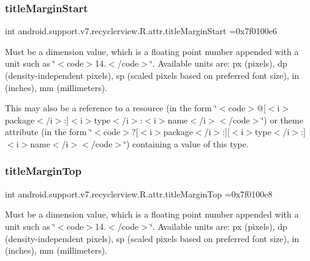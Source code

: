 \subsubsection{\texorpdfstring{title\+Margin\+Start}{titleMarginStart}}
{\footnotesize\ttfamily int android.\+support.\+v7.\+recyclerview.\+R.\+attr.\+title\+Margin\+Start =0x7f0100e6\hspace{0.3cm}{\ttfamily [static]}}

Must be a dimension value, which is a floating point number appended with a unit such as \char`\"{}$<$code$>$14.\+5sp$<$/code$>$\char`\"{}. Available units are\+: px (pixels), dp (density-\/independent pixels), sp (scaled pixels based on preferred font size), in (inches), mm (millimeters). 

This may also be a reference to a resource (in the form \char`\"{}$<$code$>$@\mbox{[}$<$i$>$package$<$/i$>$\+:\mbox{]}$<$i$>$type$<$/i$>$\+:$<$i$>$name$<$/i$>$$<$/code$>$\char`\"{}) or theme attribute (in the form \char`\"{}$<$code$>$?\mbox{[}$<$i$>$package$<$/i$>$\+:\mbox{]}\mbox{[}$<$i$>$type$<$/i$>$\+:\mbox{]}$<$i$>$name$<$/i$>$$<$/code$>$\char`\"{}) containing a value of this type. \mbox{\label{classandroid_1_1support_1_1v7_1_1recyclerview_1_1R_1_1attr_aa37a853cbf758c45773a8a3dfd60b0fc}} 
\subsubsection{\texorpdfstring{title\+Margin\+Top}{titleMarginTop}}
{\footnotesize\ttfamily int android.\+support.\+v7.\+recyclerview.\+R.\+attr.\+title\+Margin\+Top =0x7f0100e8\hspace{0.3cm}{\ttfamily [static]}}

Must be a dimension value, which is a floating point number appended with a unit such as \char`\"{}$<$code$>$14.\+5sp$<$/code$>$\char`\"{}. Available units are\+: px (pixels), dp (density-\/independent pixels), sp (scaled pixels based on preferred font size), in (inches), mm (millimeters). 

